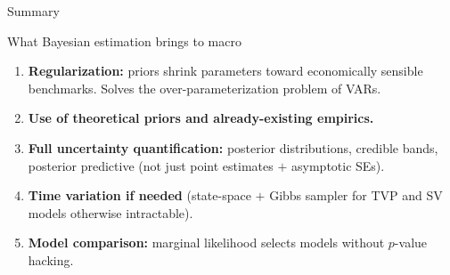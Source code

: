 \documentclass{beamer}
\begin{document}
\begin{frame}{Summary}
\footnotesize

\begin{block}{What Bayesian estimation brings to macro}
\begin{enumerate}
  \item \textbf{Regularization:} priors shrink parameters toward economically sensible benchmarks.
        Solves the over-parameterization problem of VARs.
        \item \textbf{Use of theoretical priors and already-existing empirics.}
  \item \textbf{Full uncertainty quantification:} posterior distributions, credible bands,
        posterior predictive (not just point estimates $+$ asymptotic SEs).
  \item \textbf{Time variation if needed} (state-space $+$ Gibbs sampler for
        TVP and SV models otherwise intractable).
  \item \textbf{Model comparison:} marginal likelihood selects models without $p$-value hacking.
\end{enumerate}
\end{block}


\end{frame}
\end{document}
